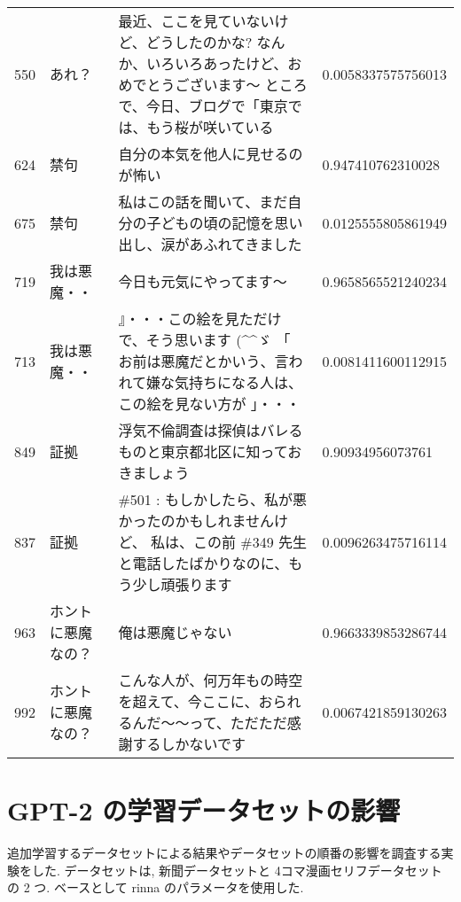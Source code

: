 \documentclass[onecolumn]{ujarticle}   %
\begin{document}
\begin{table}[tbh]
\begin{center}
\begin{tabular}{lp{5cm}p{7cm}l}
550     & あれ？                 & 最近、ここを見ていないけど、どうしたのかな? なんか、いろいろあったけど、おめでとうございます～ ところで、今日、ブログで「東京では、もう桜が咲いている & 0.0058337575756013 \\
624     & 禁句                  & 自分の本気を他人に見せるのが怖い                                                             & 0.947410762310028  \\
675     & 禁句                  & 私はこの話を聞いて、まだ自分の子どもの頃の記憶を思い出し、涙があふれてきました                                      & 0.0125555805861949 \\
719     & 我は悪魔・・              & 今日も元気にやってます～                                                                 & 0.9658565521240234 \\
713 & 我は悪魔・・       & 』・・・この絵を見ただけで、そう思います (\textasciicircum{}\textasciicircum{}ゞ 「 お前は悪魔だとかいう、言われて嫌な気持ちになる人は、この絵を見ない方が 」・・・   & 0.0081411600112915 \\
849     & 証拠                  & 浮気不倫調査は探偵はバレるものと東京都北区に知っておきましょう                                              & 0.90934956073761   \\
837     & 証拠                  & \#501 : もしかしたら、私が悪かったのかもしれませんけど、 私は、この前 \#349 先生と電話したばかりなのに、もう少し頑張ります        & 0.0096263475716114 \\
963     & ホントに悪魔なの？           & 俺は悪魔じゃない                                                                     & 0.9663339853286744 \\
992     & ホントに悪魔なの？           & こんな人が、何万年もの時空を超えて、今ここに、おられるんだ～～って、ただただ感謝するしかないです                             & 0.0067421859130263
\end{tabular}
    \label{tab:task}
  \end{center}
\end{table}


\section{GPT-2 の学習データセットの影響}

追加学習するデータセットによる結果やデータセットの順番の影響を調査する実験をした.
データセットは, 新聞データセットと 4コマ漫画セリフデータセットの 2 つ.
ベースとして rinna のパラメータを使用した.
\end{document}
